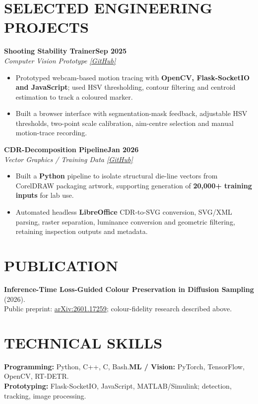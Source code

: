 \documentclass[10pt,a4paper]{article}
\newcommand{\entry}[3]{\noindent\textbf{#1}\hfill\textbf{#3}\\[-1pt]\textit{#2}\par}
\newenvironment{cvitems}{\begin{itemize}[leftmargin=1.1em,label=\textbullet,itemsep=2pt,topsep=3pt,parsep=0pt,partopsep=0pt]}{\end{itemize}}
\begin{document}
\section{SELECTED ENGINEERING PROJECTS}
\entry{Shooting Stability Trainer}{Computer Vision Prototype \href{https://github.com/MushuRam01/Shooting-Stability-Trainer}{[GitHub]}}{Sep 2025}
\begin{cvitems}
  \item Prototyped webcam-based motion tracing with \textbf{OpenCV, Flask-SocketIO and JavaScript}; used HSV thresholding, contour filtering and centroid estimation to track a coloured marker.
  \item Built a browser interface with segmentation-mask feedback, adjustable HSV thresholds, two-point scale calibration, aim-centre selection and manual motion-trace recording.
\end{cvitems}
\entry{CDR-Decomposition Pipeline}{Vector Graphics / Training Data \href{https://github.com/MushuRam01/CDR-Decomposition}{[GitHub]}}{Jan 2026}
\begin{cvitems}
  \item Built a \textbf{Python} pipeline to isolate structural die-line vectors from CorelDRAW packaging artwork, supporting generation of \textbf{20,000+ training inputs} for lab use.
  \item Automated headless \textbf{LibreOffice} CDR-to-SVG conversion, SVG/XML parsing, raster separation, luminance conversion and geometric filtering, retaining inspection outputs and metadata.
\end{cvitems}
\section{PUBLICATION}
\textbf{Inference-Time Loss-Guided Colour Preservation in Diffusion Sampling} (2026).\\
Public preprint: \href{https://arxiv.org/abs/2601.17259}{arXiv:2601.17259}; colour-fidelity research described above.
\section{TECHNICAL SKILLS}
\textbf{Programming:} Python, C++, C, Bash.\quad \textbf{ML / Vision:} PyTorch, TensorFlow, OpenCV, RT-DETR.\\\textbf{Prototyping:} Flask-SocketIO, JavaScript, MATLAB/Simulink; detection, tracking, image processing.
\end{document}
